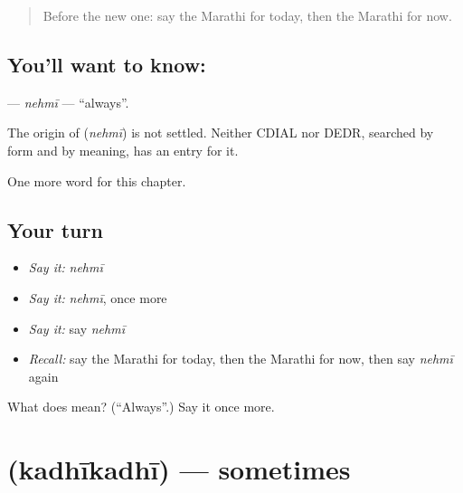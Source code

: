 \label{lesson:MR-C110-nehmi}



\begin{quote}
Before the new one: say the Marathi for today, then the Marathi for now.
\end{quote}

\subsection*{You'll want to know: }
\textbf{} — \emph{nehmī} — \textquotedblleft{}always\textquotedblright{}.

\begin{cousinweb}
The origin of \textbf{} (\emph{nehmī}) is not settled. Neither CDIAL nor DEDR, searched by form and by meaning, has an entry for it.
\end{cousinweb}

\begin{grammarlens}[title={What you've built}]
One more word for this chapter.
\end{grammarlens}

\subsection*{Your turn}
\begin{itemize}
\raggedright
  \item \emph{Say it:} \emph{nehmī}
  \item \emph{Say it:} \emph{nehmī}, once more
  \item \emph{Say it:} say \emph{nehmī}
  \item \emph{Recall:} say the Marathi for today, then the Marathi for now, then say \emph{nehmī} again
\end{itemize}

\begin{tcolorbox}[breakable,colback=teal!4,colframe=teal!35!black,title={Before you move on}]
What does  mean? (\textquotedblleft{}Always\textquotedblright{}.) Say it once more.
\end{tcolorbox}
\section[\texorpdfstring{\mr{कधीकधी} (kadhīkadhī)}{कधीकधी (kadhīkadhī)}]{ (kadhīkadhī) — sometimes}

\label{lesson:MR-C110-kadhikadhi}




